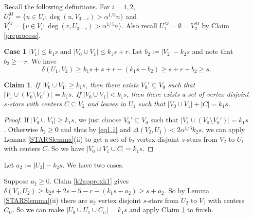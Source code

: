 \documentclass[oneside,12pt]{memoir}
\newtheorem{claim}[theorem]{Claim}
\begin{document}
Recall the following definitions. For $i=1,2$, $U_i^M=\{u\in U_i:\deg(u, V_{3-i})>\alpha^{1/3}n\}$ and $V_i^M=\{v\in V_i: \deg(v, U_{3-i})>\alpha^{1/3}n \}$. Also recall $U_1^M=\emptyset=V_2^M$ by Claim \ref{preprocess}.

\noindent
\textbf{Case 1} $|V_1|\leq k_1s$ and $|V_0\cup V_1|\leq k_1s+r$.  Let $b_2:=|V_2|-k_2s$ and note that $b_2\geq -r$.  We have 
\begin{equation} 
\label{eq1.1} \delta(U_1, V_2)\geq k_1s+s+r-(k_1s-b_2)\geq s+r+b_2\geq s. 
\end{equation}

\begin{claim}\label{Claim1}
If $|V_0\cup V_1|\geq k_1s$, then there exists $V_0'\subseteq V_0$ such that $|V_1\cup (V_0\setminus V_0')|=k_1s$.  If $|V_0\cup V_1|<k_1s$, then there exists a set of vertex disjoint $s$-stars with centers $C\subseteq V_2$  and leaves in $U_1$ such that $|V_0\cup V_1|+|C|=k_1s$.
\end{claim}

\begin{proof}
If $|V_0\cup V_1|\geq k_1s$, we just choose $V_0'\subseteq V_0$ such that $|V_1\cup (V_0\setminus V_0')|=k_1s$.  Otherwise $b_2\geq 0$ and thus by \eqref{eq1.1} and $\Delta(V_2, U_1)<2\alpha^{1/3}k_2s$, we can apply Lemma \ref{STARSlemma}(ii) to get a set of $b_2$ vertex disjoint $s$-stars from $V_2$ to $U_1$ with centers $C$.  So we have $|V_0\cup V_1\cup C|=k_1s$.
\end{proof}

Let $a_2:=|U_2|-k_2s$. We have two cases.

Suppose $a_2\geq 0$. Claim \ref{k2approxk1} gives $\delta(V_1, U_2)\geq k_2s+2s-5-r-(k_1s-a_2)\geq s+a_2$.  So by Lemma \ref{STARSlemma}(ii) there are $a_2$ vertex disjoint $s$-stars from $U_2$ to $V_1$ with centers $C_U$.  So we can make $|U_0\cup U_1\cup C_U|=k_1s$ and apply Claim \ref{Claim1} to finish.
\end{document}

